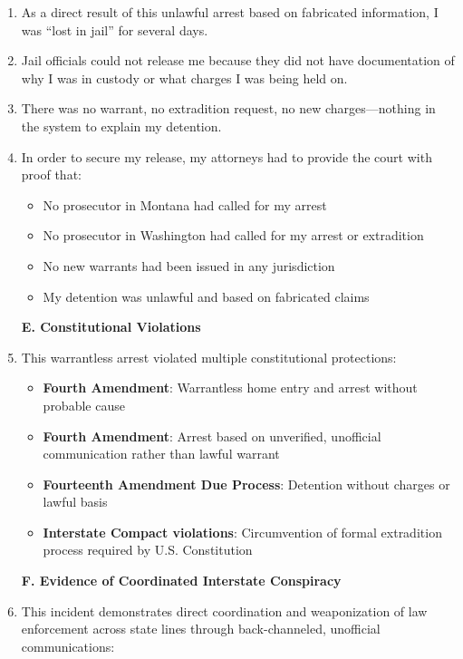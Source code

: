 \documentclass[12pt,letterpaper]{article}
\begin{document}
\begin{enumerate}
\textbf{D. ``Lost in Jail'' for Multiple Days}

\item As a direct result of this unlawful arrest based on fabricated information, I was ``lost in jail'' for several days.

\item Jail officials could not release me because they did not have documentation of why I was in custody or what charges I was being held on.

\item There was no warrant, no extradition request, no new charges---nothing in the system to explain my detention.

\item In order to secure my release, my attorneys had to provide the court with proof that:

\begin{itemize}
\item No prosecutor in Montana had called for my arrest
\item No prosecutor in Washington had called for my arrest or extradition
\item No new warrants had been issued in any jurisdiction
\item My detention was unlawful and based on fabricated claims
\end{itemize}

\textbf{E. Constitutional Violations}

\item This warrantless arrest violated multiple constitutional protections:

\begin{itemize}
\item \textbf{Fourth Amendment}: Warrantless home entry and arrest without probable cause
\item \textbf{Fourth Amendment}: Arrest based on unverified, unofficial communication rather than lawful warrant
\item \textbf{Fourteenth Amendment Due Process}: Detention without charges or lawful basis
\item \textbf{Interstate Compact violations}: Circumvention of formal extradition process required by U.S. Constitution
\end{itemize}

\textbf{F. Evidence of Coordinated Interstate Conspiracy}

\item This incident demonstrates direct coordination and weaponization of law enforcement across state lines through back-channeled, unofficial communications:


\end{enumerate}
\end{document}
